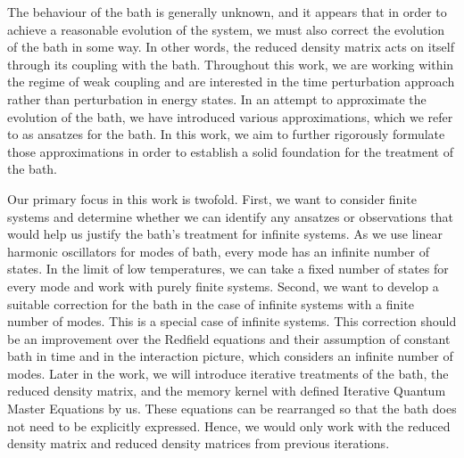 The behaviour of the bath is generally unknown, and it appears that in order to achieve a reasonable evolution of the system, we must also correct the evolution of the bath in some way. In other words, the reduced density matrix acts on itself through its coupling with the bath. Throughout this work, we are working within the regime of weak coupling and are interested in the time perturbation approach rather than perturbation in energy states. In an attempt to approximate the evolution of the bath, we have introduced various approximations, which we refer to as ansatzes for the bath. In this work, we aim to further rigorously formulate those approximations in order to establish a solid foundation for the treatment of the bath.

Our primary focus in this work is twofold. First, we want to consider finite systems and determine whether we can identify any ansatzes or observations that would help us justify the bath's treatment for infinite systems. As we use linear harmonic oscillators for modes of bath, every mode has an infinite number of states. In the limit of low temperatures, we can take a fixed number of states for every mode and work with purely finite systems. Second, we want to develop a suitable correction for the bath in the case of infinite systems with a finite number of modes. This is a special case of infinite systems. This correction should be an improvement over the Redfield equations and their assumption of constant bath in time and in the interaction picture, which considers an infinite number of modes. Later in the work, we will introduce iterative treatments of the bath, the reduced density matrix, and the memory kernel with defined Iterative Quantum Master Equations by us. These equations can be rearranged so that the bath does not need to be explicitly expressed. Hence, we would only work with the reduced density matrix and reduced density matrices from previous iterations.

